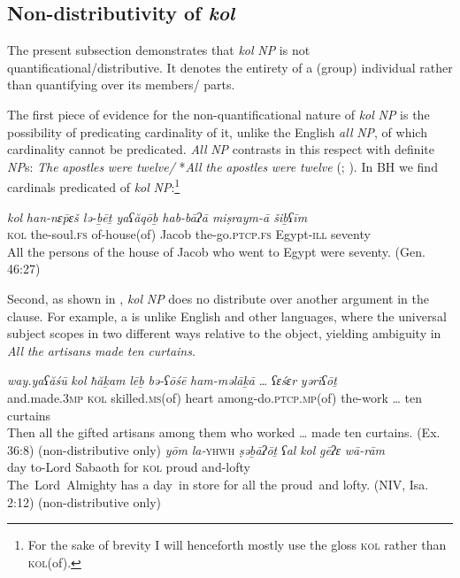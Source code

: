 \documentclass[output=paper]{langsci/langscibook}
\begin{document}
\subsection{Non-distributivity of \textit{kol}}%

The present subsection demonstrates that \textit{kol} \textit{NP} is not quantificational/distributive. It denotes the entirety of a (group) individual rather than quantifying over its members/ parts. 

The first piece of evidence for the non-quantificational nature of \textit{kol} \textit{NP} is the possibility of predicating cardinality of it, unlike the English \textit{all} \textit{NP}, of which cardinality cannot be predicated. \textit{All} \textit{NP} contrasts in this respect with definite \textit{NP}s: \textit{The} \textit{apostles} \textit{were} \textit{twelve/} *\textit{All} \textit{the} \textit{apostles} \textit{were} \textit{twelve} (\citealt{Dowty1987}; \citealt{Winter2002}). In BH we find cardinals predicated of \textit{kol} \textit{NP}:\footnote{For the sake of brevity I will henceforth mostly use the gloss \textsc{kol} rather than \textsc{kol}(of).}

\ea%
    \label{ex:doron:14}
    \gll \textit{kol}   \textit{han-nɛ\={p}ɛš   lə-ḇēṯ            yaʕăqōḇ  hab-bāʔā            miṣraym-ā    šiḇʕīm}\\
         \textsc{kol} the-soul.\textsc{fs} of-house(of) Jacob       the-go.\textsc{ptcp.fs}   Egypt-\textsc{ill}      seventy\\
    \glt All the persons of the house of Jacob who went to Egypt were seventy. (Gen. 46:27)
\z

Second, as shown in , \textit{kol} \textit{NP} does no distribute over another argument in the clause. For example, a is unlike English and other languages, where the universal subject scopes in two different ways relative to the object, yielding ambiguity in \textit{All} \textit{the} \textit{artisans} \textit{made} \textit{ten} \textit{curtains}. 

\ea%
    \label{ex:doron:15}
    \ea
    \gll \textit{way.yaʕăśū}      \textit{kol}   \textit{ħăḵam}            \textit{lēḇ}     \textit{bə-ʕōśē}                          \textit{ham-məlāḵā}  …  \textit{ʕɛśɛr}  \textit{yərīʕōṯ}\\
         and.made.\textsc{3mp} \textsc{kol} skilled.\textsc{ms}(of) heart among-do.\textsc{ptcp.mp}(of)  the-work      \textsc{…}   ten    curtains  \\
    \glt Then all the gifted artisans among them who worked … made ten curtains.   (Ex. 36:8)  (non-distributive only)
    \ex  
    \gll \textit{yōm} \textit{la-}\textsc{yhwh}\textit{\MakeUppercase{} } \textit{ṣəḇāʔōṯ}    \textit{ʕal}  \textit{kol}    \textit{gēʔɛ}    \textit{wā-rām}       \\
         day  to-Lord   Sabaoth   for  \textsc{kol}  proud and-lofty  \\
    \glt The~Lord~Almighty has a day~in store for all the proud~and lofty. (NIV, Isa. 2:12) (non-distributive only)
    \z
\z
\end{document}

